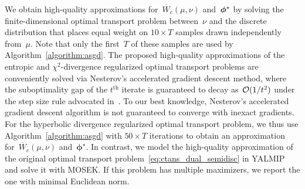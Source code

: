 \documentclass[11pt, a4paper, oneside, reqno]{article}
\begin{document}
	We obtain high-quality approximations for~$\overline W_c(\mu, \nu)$ and~$\boldsymbol \phi^\star$ by solving the finite-dimensional optimal transport problem between~$\nu$ and the discrete distribution that places equal weight on $10 \times T$ samples drawn independently from~$\mu$. Note that only the first~$T$ of these samples are used by Algorithm~\ref{algorithm:asgd}. The proposed high-quality approximations of the {\color{black} entropic and $\chi^2$-divergence regularized} optimal transport problems are conveniently solved via Nesterov's accelerated gradient descent method, where the suboptimality gap of the $t^{\text{th}}$ iterate is guaranteed to decay as~$\mathcal O(1/ t^2)$ under the step size rule advocated in~\citep[Theorem~1]{Nesterov1983AMF}.
	{\color{black} To our best knowledge, Nesterov's accelerated gradient descent algorithm is not guaranteed to converge with inexact gradients. For the hyperbolic divergence regularized optimal transport problem, we thus use Algorithm~\ref{algorithm:asgd} with $50 \times T$ iterations to obtain an approximation for~$\overline W_c(\mu, \nu)$ and~$\bm \phi^\star$.}
	In contrast, we model the high-quality approximation of the original optimal transport problem~\eqref{eq:ctans_dual_semidisc} in YALMIP~\citep{yalmip} and solve it with MOSEK. If this problem has multiple maximizers, we report the one with minimal Euclidean norm.
    
\end{document}
